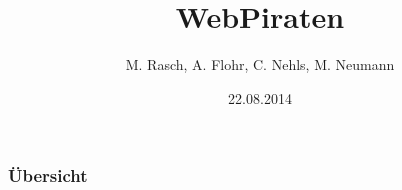 \documentclass{beamer}
\begin{document}

\title{WebPiraten}  
\author{M. Rasch, A. Flohr, C. Nehls, M. Neumann}
\date{22.08.2014} 

\begin{frame}
\maketitle
\end{frame} 

\begin{frame}
\frametitle{Übersicht}

\tableofcontents
\end{frame}


\end{document}
